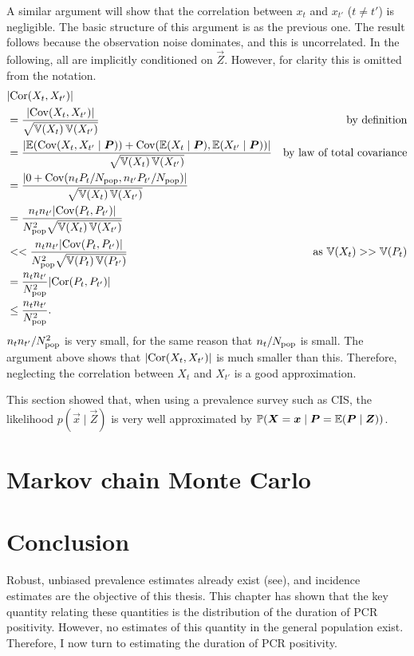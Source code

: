\documentclass[thesis.tex]{subfiles}
\begin{document}
A similar argument will show that the correlation between $x_t$ and $x_{t'}$ ($t \neq t'$) is negligible.
The basic structure of this argument is as the previous one.
The result follows because the observation noise dominates, and this is uncorrelated.
In the following, all are implicitly conditioned on $\vec{Z}$.
However, for clarity this is omitted from the notation.
\begin{align}
  &\lvert \operatorname{Cor}(X_t, X_{t'}) \rvert \\
  &= \frac{\lvert\operatorname{Cov}(X_t, X_{t'})\rvert}{\sqrt{\operatorname{\mathbb{V}}(X_t) \operatorname{\mathbb{V}}(X_{t'})}} &\text{by definition}\\
  &= \frac{\lvert \operatorname{\mathbb{E}}(\operatorname{Cov}(X_t, X_{t'} \mid \bm{P})) + \operatorname{Cov}(\operatorname{\mathbb{E}}(X_t \mid \bm{P}), \operatorname{\mathbb{E}}(X_{t'} \mid \bm{P})) \rvert}{\sqrt{\operatorname{\mathbb{V}}(X_t) \operatorname{\mathbb{V}}(X_{t'})}} &\text{by law of total covariance} \\
  &= \frac{\lvert 0 + \operatorname{Cov}(n_t P_t / N_\text{pop}, n_{t'} P_{t'} / N_\text{pop}) \rvert}{\sqrt{\operatorname{\mathbb{V}}(X_t) \operatorname{\mathbb{V}}(X_{t'})}} \\
  &= \frac{n_t n_{t'} \lvert \operatorname{Cov}(P_t, P_{t'}) \rvert}{N_\text{pop}^2 \sqrt{\operatorname{\mathbb{V}}(X_t) \operatorname{\mathbb{V}}(X_{t'})}}  \\
  &<< \frac{n_t n_{t'} \lvert \operatorname{Cov}(P_t, P_{t'}) \rvert}{N_\text{pop}^2 \sqrt{\operatorname{\mathbb{V}}(P_t) \operatorname{\mathbb{V}}(P_{t'})}} &\text{as $\operatorname{\mathbb{V}}(X_t) >> \operatorname{\mathbb{V}}(P_t)$} \\
  &= \frac{n_t n_{t'}}{N_\text{pop}^2} \lvert \operatorname{Cor}(P_t, P_{t'}) \rvert \\
  &\leq \frac{n_t n_{t'}}{N_\text{pop}^2}.
\end{align}
$n_t n_{t'} / N_\text{pop}^2$ is very small, for the same reason that $n_t / N_\text{pop}$ is small.
The argument above shows that $\lvert \operatorname{Cor}(X_t, X_{t'}) \rvert$ is much smaller than this.
Therefore, neglecting the correlation between $X_t$ and $X_{t'}$ is a good approximation.

This section showed that, when using a prevalence survey such as CIS, the likelihood $p(\vec{x} \mid \vec{Z})$ is very well approximated by $\operatorname{\mathbb{P}}(\bm{X} = \bm{x} \mid \bm{P} = \operatorname{\mathbb{E}}(\bm{P} \mid \bm{Z}))$.


\section{Markov chain Monte Carlo} \label{inc-prev:sec:MCMC}

\section{Conclusion} \label{inc-prev:sec:conclusion}

Robust, unbiased prevalence estimates already exist (see), and incidence estimates are the objective of this thesis.
This chapter has shown that the key quantity relating these quantities is the distribution of the duration of PCR positivity.
However, no estimates of this quantity in the general population exist.
Therefore, I now turn to estimating the duration of PCR positivity.

\ifSubfilesClassLoaded{
  \listoftodos
}{}
\end{document}
